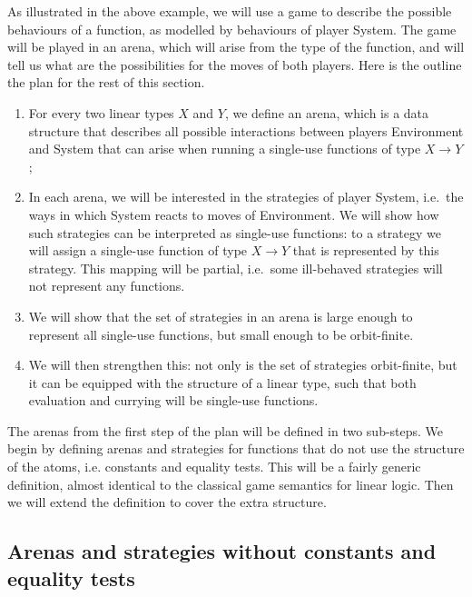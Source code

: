 As illustrated in the above example, we will use a game to describe the possible behaviours of a function, as modelled by behaviours of player System. The game will be played in an arena, which will arise from the type of the function, and will tell us what are the possibilities for the moves of both players.  Here is the  outline the plan for the rest of this section. 
\begin{enumerate}
    \item For every two linear types $X$ and $Y$, we  define an arena, which is a data structure that describes all possible interactions between players Environment and System that can arise when running a  single-use  functions of type $X \to Y$;
    \item In each arena, we will be interested in the strategies of player System, i.e.~the ways in which System reacts to moves of Environment. We will show how such strategies can be interpreted as single-use functions: to a strategy we will assign a single-use function of type $X \to Y$ that is represented by this strategy. This mapping will be partial, i.e.~some ill-behaved strategies will not represent any functions. 
    \item We will show that the  set of strategies in an arena is  large enough to represent all single-use functions, but small enough to be orbit-finite. 
    \item We will then strengthen this: not only is the set of strategies orbit-finite, but it can be equipped with the structure of a linear type, such that both evaluation and currying will be single-use functions.
\end{enumerate}

The arenas from the first step of the plan will  be defined in two sub-steps. We begin by defining arenas and strategies for functions that do not use the structure of the atoms, i.e. constants and equality tests. This will be a fairly generic definition, almost identical to the classical game semantics for linear logic. Then we will extend the definition to cover the extra structure. 

\subsection{Arenas and strategies without constants and equality tests}
\label{sec:arenas-without-constants-and-equality-tests}

